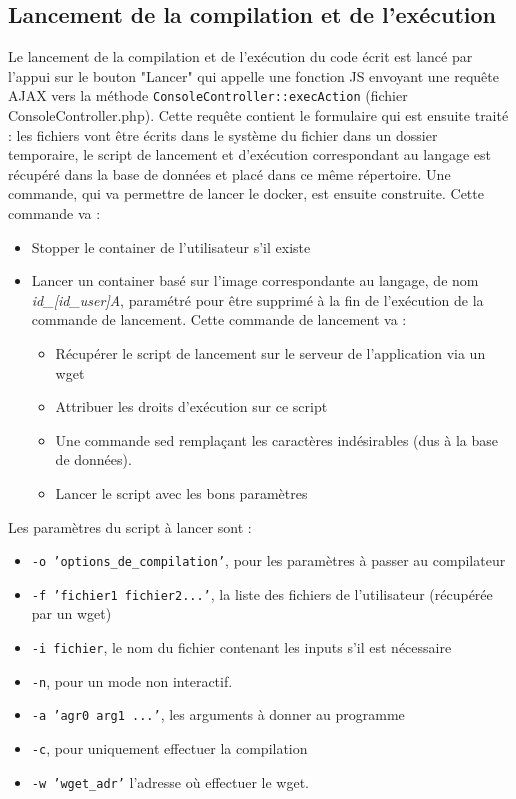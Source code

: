 \subsection{Lancement de la compilation et de l'exécution}

Le lancement de la compilation et de l'exécution du code écrit est lancé par l'appui sur le bouton "Lancer" qui appelle une fonction JS envoyant une requête AJAX vers la méthode \texttt{ConsoleController::execAction} (fichier ConsoleController.php). Cette requête contient le formulaire qui est ensuite traité : les fichiers vont être écrits dans le système du fichier dans un dossier temporaire, le script de lancement et d'exécution correspondant au langage est récupéré dans la base de données et placé dans ce même répertoire. Une commande, qui va permettre de lancer le docker, est ensuite construite. Cette commande va :
\begin{itemize}
  \item Stopper le container de l'utilisateur s'il existe
  \item{Lancer un container basé sur l'image correspondante au langage, de nom \emph{id\_[id\_user]A}, paramétré pour être supprimé à la fin de l'exécution de la commande de lancement. Cette commande de lancement va :
  \begin{itemize}
    \item Récupérer le script de lancement sur le serveur de l'application via un wget
    \item Attribuer les droits d'exécution sur ce script
    \item Une commande sed remplaçant les caractères indésirables (dus à la base de données).
    \item Lancer le script avec les bons paramètres
  \end{itemize}}
\end{itemize}

Les paramètres du script à lancer sont :
\begin{itemize}
  \item \texttt{-o 'options\_de\_compilation'}, pour les paramètres à passer au compilateur
  \item \texttt{-f 'fichier1 fichier2...'}, la liste des fichiers de l'utilisateur (récupérée par un wget)
  \item \texttt{-i fichier}, le nom du fichier contenant les inputs s'il est nécessaire
  \item \texttt{-n}, pour un mode non interactif.
  \item \texttt{-a 'agr0 arg1 ...'}, les arguments à donner au programme
  \item \texttt{-c}, pour uniquement effectuer la compilation
  \item \texttt{-w 'wget\_adr'} l'adresse où effectuer le wget.
\end{itemize}

